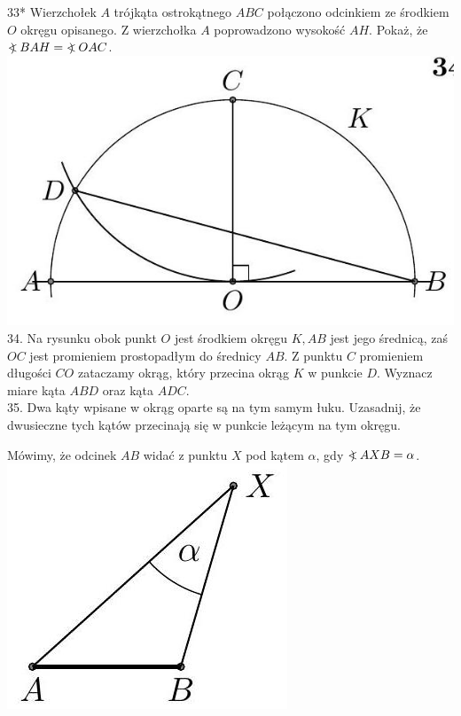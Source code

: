 \documentclass[10pt]{article}
\newcommand\Varangle{\mathop{{<\!\!\!\!\!\text{\small)}}\:}\nolimits}
\begin{document}
33* Wierzchołek \(A\) trójkąta ostrokątnego \(A B C\) połączono odcinkiem ze środkiem \(O\) okręgu opisanego. Z wierzchołka \(A\) poprowadzono wysokość \(A H\). Pokaż, że \(\Varangle B A H=\Varangle O A C\).\\
\includegraphics[max width=\textwidth, center]{2024_11_21_71f62bd117d375398909g-188}\\
34. Na rysunku obok punkt \(O\) jest środkiem okręgu \(K, A B\) jest jego średnicą, zaś \(O C\) jest promieniem prostopadłym do średnicy \(A B\). Z punktu \(C\) promieniem długości \(C O\) zataczamy okrąg, który przecina okrąg \(K\) w punkcie \(D\). Wyznacz miare kąta \(A B D\) oraz kąta \(A D C\).\\
35. Dwa kąty wpisane w okrąg oparte są na tym samym łuku. Uzasadnij, że dwusieczne tych kątów przecinają się w punkcie leżącym na tym okręgu.

Mówimy, że odcinek \(A B\) widać z punktu \(X\) pod kątem \(\alpha\), gdy \(\Varangle A X B=\alpha\).\\
\includegraphics[max width=\textwidth, center]{2024_11_21_71f62bd117d375398909g-188(2)}
\end{document}
